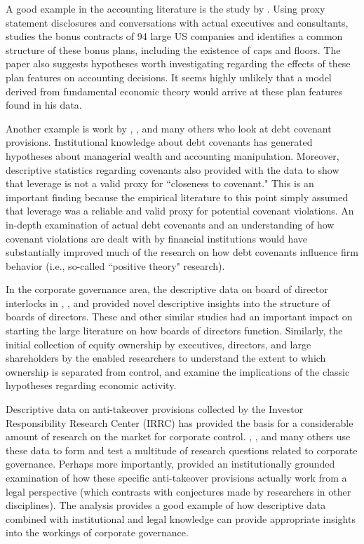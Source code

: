 \documentclass[12pt,reqno,titlepage]{amsart}
\theoremstyle{definition}
\begin{document}
\begin{doublespace}
A good example in the accounting literature is the study by \citet{Healy:1985jg}.  
Using proxy statement disclosures and conversations with actual executives and consultants, \citet{Healy:1985jg} studies the bonus contracts of 94 large US companies and identifies a common structure of these bonus plans, including the existence of caps and floors. 
The paper also suggests hypotheses worth investigating regarding the effects of these plan features on accounting decisions.
It seems highly unlikely that a model derived from fundamental economic theory would arrive at these plan features found in his data. 

Another example is work by \citet{SmithJr:1979hv}, \cite{Kalay:1982gv}, and many others who look at debt covenant provisions.
Institutional knowledge about debt covenants has generated hypotheses about managerial wealth and accounting manipulation.
Moreover, descriptive statistics regarding covenants also provided \cite{Dichev:2002} with the data to show that leverage is not a valid proxy for ``closeness to covenant."
This is an important finding because the empirical literature to this point simply assumed that leverage was a reliable and valid proxy for potential covenant violations.  
An in-depth examination of actual debt covenants and an understanding of how covenant violations are dealt with by financial institutions would have substantially improved much of the research on how debt covenants influence firm behavior (i.e., so-called ``positive theory" research).

In the corporate governance area, the descriptive data on board of director interlocks in \citet{brandeis1913breaking}, \citet{us1951report}, and \cite{united1978interlocking} provided novel descriptive insights into the structure of boards of directors.
These and other similar studies had an important impact on starting the large literature on how boards of directors function. 
Similarly, the initial collection of equity ownership by executives, directors, and large shareholders by the \cite{securities1936official} enabled researchers to understand the extent to which ownership is separated from control, and examine the implications of the classic \cite{berle1932modern} hypotheses regarding economic activity.

Descriptive data on anti-takeover provisions collected by the Investor Responsibility Research Center (IRRC) has provided the basis for a considerable amount of research on the market for corporate control. 
\cite{Gompers:2003tl}, \cite{Bebchuk:2009ii}, and many others use these data to form and test a multitude of research questions related to corporate governance.  
Perhaps more importantly, \cite{Daines:2001hi} provided an institutionally grounded examination of how these specific anti-takeover provisions actually work from a legal perspective (which contrasts with conjectures made by researchers in other disciplines).  
The \cite{Daines:2001hi} analysis provides a good example of how descriptive data combined with institutional and legal knowledge can provide appropriate insights into the workings of corporate governance.


\end{doublespace}
\end{document}
